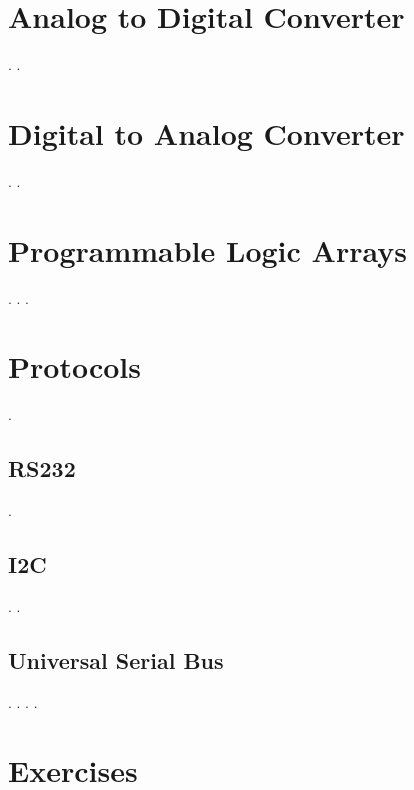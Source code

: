 
\section{Analog to Digital Converter}
\pagebreak
.
\pagebreak
.

\section{Digital to Analog Converter}
\pagebreak
.
\pagebreak
.

\section{Programmable Logic Arrays}
\pagebreak
.
\pagebreak
.
\pagebreak
.

\section{Protocols}
\pagebreak
.
\subsection{RS232}
\pagebreak
.
\subsection{I2C}
\pagebreak
.
\pagebreak
.
\subsection{Universal Serial Bus}
\pagebreak
.
\pagebreak
.
\pagebreak
.
\pagebreak
.



\section{Exercises}

